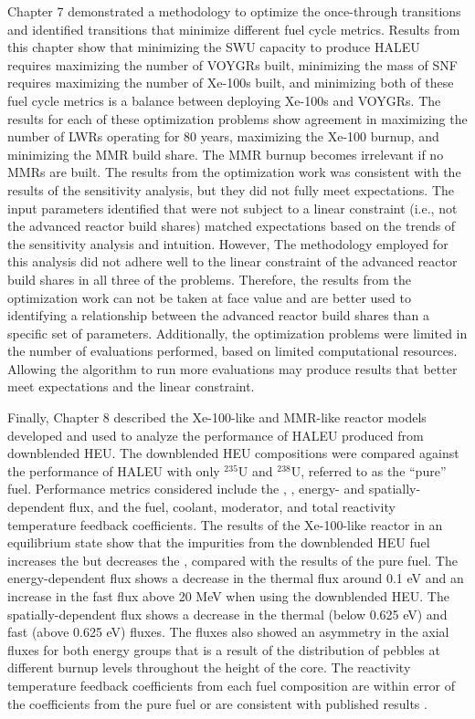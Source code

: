Chapter 7 demonstrated a methodology to optimize the once-through 
transitions and identified transitions that minimize different 
fuel cycle metrics. Results from this chapter show that minimizing the 
\gls{SWU} capacity to produce \gls{HALEU} requires maximizing the number of 
VOYGRs built, minimizing the mass of \gls{SNF} requires maximizing the number 
of Xe-100s built, and minimizing both of these fuel cycle metrics is a 
balance between deploying Xe-100s and VOYGRs. The results for each 
of these optimization problems show agreement in maximizing the number 
of \glspl{LWR} operating for 80 years, maximizing the Xe-100 burnup,
and minimizing the \gls{MMR} build share. The \gls{MMR} burnup becomes
irrelevant if no \glspl{MMR} are built. The results from the optimization 
work was consistent with the results of the sensitivity analysis, but 
they did not fully meet expectations. The input parameters identified that 
were not subject to a linear constraint (i.e., not the advanced reactor 
build shares) matched expectations based on the trends of the sensitivity 
analysis and intuition. However, The methodology employed for this 
analysis did not adhere well to the linear constraint of the advanced reactor 
build shares in all three of the problems. Therefore, the 
results from the optimization work can not be taken at face value 
and are better used to identifying a relationship between the advanced 
reactor build shares than a specific set of parameters. Additionally, 
the optimization problems were limited in the number of evaluations
performed, based on limited computational resources. Allowing the 
algorithm to run more evaluations may produce results that better 
meet expectations and the linear constraint. 

Finally, Chapter 8 described the Xe-100-like and 
\gls{MMR}-like reactor models developed and 
used to analyze the performance of \gls{HALEU} produced from 
downblended \gls{HEU}. The downblended \gls{HEU} compositions 
were compared against the performance of \gls{HALEU} with only 
$^{235}$U and $^{238}$U, referred to as the ``pure'' fuel. 
Performance metrics considered include the 
\keff, \betaEff, energy- and spatially-dependent flux, and 
the fuel, coolant, moderator, and total reactivity temperature 
feedback coefficients. The results of the Xe-100-like 
reactor in an equilibrium state show that the impurities from 
the downblended 
\gls{HEU} fuel increases the \keff but decreases the \betaEff, 
compared with the results of the pure fuel. 
The energy-dependent flux shows a decrease in the thermal flux 
around 0.1 eV and an increase in the fast flux above 20 MeV 
when using the downblended \gls{HEU}. The spatially-dependent 
flux shows a decrease in the thermal (below 0.625 eV) and 
fast (above 0.625 eV) fluxes. The fluxes also showed an asymmetry 
in the axial fluxes for both energy groups that is 
a result of the distribution of pebbles at different burnup levels 
throughout the height of the core. The reactivity temperature 
feedback coefficients from each fuel composition are within 
error of the coefficients from the pure fuel or are consistent 
with published results \cite{mulder_neutronics_2020}.

